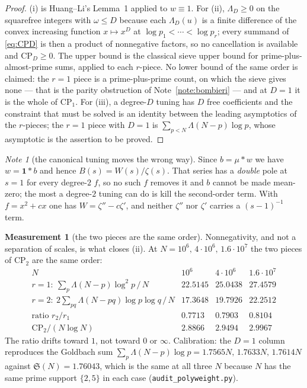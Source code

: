 \documentclass[11pt,a4paper]{article}
\theoremstyle{plain}
\theoremstyle{definition}
\newtheorem{measurement}[theorem]{Measurement}
\theoremstyle{remark}
\newtheorem{note}[theorem]{Note}
\renewcommand{\SS}{\mathfrak{S}}
\begin{document}
\begin{proof}
(i) is Huang--Li's Lemma~1 applied to $w\equiv1$. For (ii),
$\Lambda_D\ge0$ on the squarefree integers with $\omega\le D$ because
each $\Lambda_D(u)$ is a finite difference of the convex increasing
function $x\mapsto x^D$ at $\log p_1<\cdots<\log p_r$; every summand of
\eqref{eq:CPD} is then a product of nonnegative factors, so no
cancellation is available and $\mathrm{CP}_D\ge0$. The upper bound is
the classical sieve upper bound for prime-plus-almost-prime sums,
applied to each $r$-piece. No lower bound of the same order is claimed:
the $r=1$ piece is a prime-plus-prime count, on which the sieve gives
none --- that is the parity obstruction of Note~\ref{note:bombieri} ---
and at $D=1$ it is the whole of $\mathrm{CP}_1$. For
(iii), a degree-$D$ tuning has $D$ free coefficients and the
constraint that must be solved is an identity between the leading
asymptotics of the $r$-pieces; the $r=1$ piece with $D=1$ is
$\sum_{p<N}\Lambda(N-p)\log p$, whose asymptotic is the assertion to
be proved.
\end{proof}

\begin{note}[the canonical tuning moves the wrong way]
Since $b=\mu*w$ we have $w=\mathbf 1*b$ and hence
$B(s)=W(s)/\zeta(s)$. That series has a \emph{double} pole at $s=1$
for every degree-$2$ $f$, so no such $f$ removes it and $b$ cannot be
made mean-zero; the most a degree-$2$ tuning can do is kill the
second-order term. With $f=x^2+cx$ one has $W=\zeta''-c\zeta'$, and
neither $\zeta''$ nor $\zeta'$ carries a $(s-1)^{-1}$ term.
\end{note}

\begin{measurement}[the two pieces are the same order]\label{meas:poly}
Nonnegativity, and not a separation of scales, is what closes (ii).
At $N=10^6,\,4\cdot10^6,\,1.6\cdot10^7$ the two pieces of
$\mathrm{CP}_2$ are the same order:
\[
\begin{array}{r|ccc}
 N & 10^6 & 4\cdot10^6 & 1.6\cdot10^7\\\hline
 r=1:\ \sum_p\Lambda(N-p)\log^2p\,/\,N & 22.5145 & 25.0438 & 27.4579\\
 r=2:\ 2\sum_{pq}\Lambda(N-pq)\log p\log q\,/\,N
   & 17.3648 & 19.7926 & 22.2512\\
 \text{ratio } r_2/r_1 & 0.7713 & 0.7903 & 0.8104\\
 \mathrm{CP}_2/(N\log N) & 2.8866 & 2.9494 & 2.9967
\end{array}
\]
The ratio drifts toward $1$, not toward $0$ or $\infty$. Calibration:
the $D=1$ column reproduces the Goldbach sum
$\sum_p\Lambda(N-p)\log p=1.7565N,\,1.7633N,\,1.7614N$ against
$\SS(N)=1.76043$, which is the same at all three $N$ because
$N$ has the same prime support $\{2,5\}$ in each case
(\texttt{audit\_polyweight.py}).
\end{measurement}
\end{document}
